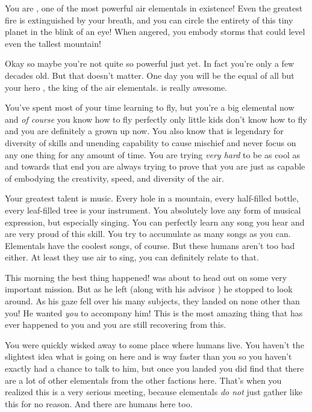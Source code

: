 \documentclass[char]{elementals}
\begin{document}
\name{\cMiniEarth{}}

You are \cMiniEarth{\intro}, one of the most powerful air elementals in existence! Even the greatest fire is extinguished by your breath, and you can circle the entirety of this tiny planet in the blink of an eye! When angered, you embody storms that could level even the tallest mountain!

Okay so maybe you're not quite so powerful just yet. In fact you're only a few decades old. But that doesn't matter. One day you will be the equal of all but your hero \cKing{\intro}, the king of the air elementals. \cKing{\They} is really awesome.

You've spent most of your time learning to fly, but you're a big elemental now and \emph{of course} you know how to fly perfectly only little kids don't know how to fly and you are definitely a grown up now. You also know that \cKing{} is legendary for \cKing{\their} diversity of skills and unending capability to cause mischief and never focus on any one thing for any amount of time. You are trying \emph{very hard} to be as cool as \cKing{} and towards that end you are always trying to prove that you are just as capable of embodying the creativity, speed, and diversity of the air.

Your greatest talent is music. Every hole in a mountain, every half-filled bottle, every leaf-filled tree is your instrument. You absolutely love any form of musical expression, but especially singing. You can perfectly learn any song you hear and are very proud of this skill. You try to accumulate as many songs as you can. Elementals have the coolest songs, of course. But these humans aren't too bad either. At least they use air to sing, you can definitely relate to that.

This morning the best thing happened! \cKing{} was about to head out on some very important mission. But as he left (along with his advisor \cNaturalist{}) he stopped to look around. As his gaze fell over his many subjects, they landed on none other than you! He wanted \emph{you} to accompany him! This is the most amazing thing that has ever happened to you and you are still recovering from this.

You were quickly wisked away to some place where humans live. You haven't the slightest idea what is going on here and \cKing{} is way faster than you so you haven't exactly had a chance to talk to him, but once you landed you did find that there are a lot of other elementals from the other factions here. That's when you realized this is a very serious meeting, because elementals \emph{do not} just gather like this for no reason. And there are humans here too.
\end{document}
